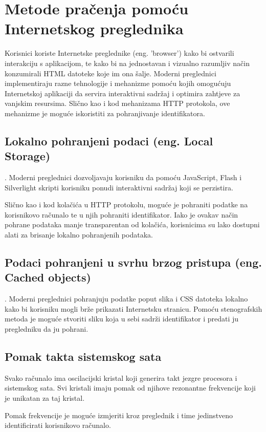 \documentclass[times, utf8, zavrsni]{fer}
\begin{document}
\section{Metode pračenja pomoću Internetskog preglednika}
Korisnici koriste Internetske preglednike (eng. 'browser') kako bi ostvarili
interakciju s aplikacijom, te kako bi na jednostavan i vizualno razumljiv način
konzumirali HTML datoteke koje im ona šalje. Moderni preglednici implementiraju
razne tehnologije i mehanizme pomoću kojih omogućuju Internetskoj aplikaciji da
servira interaktivni sadržaj i optimira zahtjeve za vanjskim resursima. Slično
kao i kod mehanizama HTTP protokola, ove mehanizme je moguće iskoristiti za
pohranjivanje identifikatora.

\subsection{Lokalno pohranjeni podaci (eng. Local Storage)}. Moderni
preglednici dozvoljavaju korisniku da pomoću JavaScript, Flash i Silverlight
skripti korisniku ponudi interaktivni sadržaj koji se perzistira.

Slično kao i kod kolačića u HTTP protokolu, moguće je pohraniti podatke
na korisnikovo računalo te u njih pohraniti identifikator. Iako je ovakav
način pohrane podataka manje transparentan od kolačića, korisnicima su lako
dostupni alati za brisanje lokalno pohranjenih podataka.

\subsection{Podaci pohranjeni u svrhu brzog pristupa (eng. Cached objects)}.
Moderni preglednici pohranjuju podatke poput slika i CSS datoteka lokalno
kako bi korisniku mogli brže prikazati Internetsku stranicu. Pomoću
stenografskih metoda je moguće stvoriti sliku koja u sebi sadrži
identifikator i predati ju pregledniku da ju pohrani.

\subsection{Pomak takta sistemskog sata}
Svako računalo ima oscilacijski kristal koji generira takt jezgre procesora
i sistemskog sata. Svi kristali imaju pomak od njihove rezonantne
frekvencije koji je unikatan za taj kristal.

Pomak frekvencije je moguće izmjeriti kroz preglednik i time jedinstveno
identificirati korisnikovo računalo.
\end{document}
